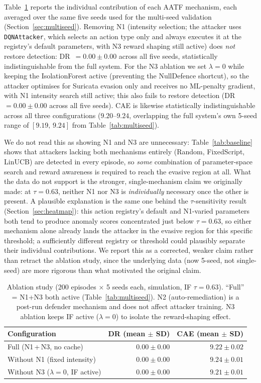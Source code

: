 \documentclass[sigconf]{acmart}
\begin{document}
Table~\ref{tab:ablation} reports the individual contribution of each
AATF mechanism, each averaged over the same five seeds used for the
multi-seed validation (Section~\ref{sec:multiseed}). Removing N1
(intensity selection; the attacker uses \texttt{DQNAttacker}, which
selects an action type only and always executes it at the registry's
default parameters, with N3 reward shaping still active) does
\emph{not} restore detection: DR~$= 0.00 \pm 0.00$ across all five
seeds, statistically indistinguishable from the full system. For the
N3 ablation we set $\lambda=0$ while keeping the IsolationForest active
(preventing the NullDefence shortcut), so the attacker optimises for
Suricata evasion only and receives no ML-penalty gradient, with N1
intensity search still active; this also fails to restore detection
(DR~$= 0.00 \pm 0.00$ across all five seeds). CAE is likewise
statistically indistinguishable across all three configurations
($9.20$--$9.24$, overlapping the full system's own 5-seed range of
$[9.19,\,9.24]$ from Table~\ref{tab:multiseed}).

We do not read this as showing N1 and N3 are unnecessary: Table~\ref{tab:baseline}
shows that attackers lacking both mechanisms entirely (Random, FixedScript,
LinUCB) are detected in every episode, so \emph{some} combination of
parameter-space search and reward awareness is required to reach the
evasive region at all. What the data do not support is the stronger,
single-mechanism claim we originally made: at $\tau=0.63$, neither N1
nor N3 is \emph{individually} necessary once the other is present. A
plausible explanation is the same one behind the $\tau$-sensitivity
result (Section~\ref{sec:heatmap}): this action registry's default and
N1-varied parameters both tend to produce anomaly scores concentrated
just below $\tau=0.63$, so either mechanism alone already lands the
attacker in the evasive region for this specific threshold; a
sufficiently different registry or threshold could plausibly separate
their individual contributions. We report this as a corrected,
weaker claim rather than retract the ablation study, since the
underlying data (now 5-seed, not single-seed) are more rigorous than
what motivated the original claim.

\begin{table}[t]
\caption{Ablation study (200 episodes $\times$ 5 seeds each, simulation,
IF $\tau=0.63$). ``Full'' = N1+N3 both active (Table~\ref{tab:multiseed}).
N2 (auto-remediation) is a post-run defender mechanism and does not
affect attacker training. N3 ablation keeps IF active ($\lambda=0$) to
isolate the reward-shaping effect.}
\label{tab:ablation}
\centering
\small
\begin{tabular}{l r r}
\toprule
Configuration & DR (mean $\pm$ SD) & CAE (mean $\pm$ SD) \\
\midrule
Full (N1\,+\,N3, no cache) & $0.00 \pm 0.00$ & $9.22 \pm 0.02$ \\
Without N1 (fixed intensity) & $0.00 \pm 0.00$ & $9.24 \pm 0.01$ \\
Without N3 ($\lambda=0$, IF active) & $0.00 \pm 0.00$ & $9.21 \pm 0.01$ \\
\bottomrule
\end{tabular}
\end{table}
\end{document}
